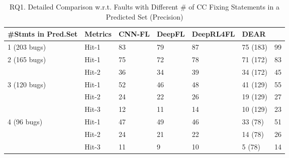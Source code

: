 


\begin{table}[t]
	\caption{RQ1. Detailed Comparison w.r.t. Faults with Different \# of CC Fixing Statements in a Predicted Set (Precision)}
\vspace{-10pt}
        \tabcolsep 2pt
	{\footnotesize
		\begin{center}
			\renewcommand{\arraystretch}{1}
			\begin{tabular}{p{1.3cm}<{\centering}|p{0.8cm}<{\centering}|p{1cm}<{\centering}|p{0.8cm}<{\centering}|p{1.3cm}<{\centering}|p{1cm}<{\centering}|p{1.3cm}<{\centering}}
				\hline
				\#Stmts in Pred.Set & Metrics & CNN-FL & DeepFL & DeepRL4FL & DEAR & \tool \\
				\hline
				\multirow{1}{*}{1 (203 bugs)}   & Hit-1  & 83 & 79 & 87 & 75 (183)& 99 \\
				\hline
				\multirow{2}{*}{2 (165 bugs)}  & Hit-1   & 75 & 72 & 78 & 71 (172) & 83 \\
				& Hit-2       						& 36 & 34 & 39 & 34 (172) & 45 \\
				\hline
				\multirow{3}{*}{3 (120 bugs)}  & Hit-1    & 52 & 46 & 48 & 41 (129) & 55 \\
				& Hit-2         					& 24 & 22 & 26 & 19 (129) & 27\\
				& Hit-3         				  	& 12 &11 & 14 & 10 (129) & 23 \\
				\hline
				\multirow{4}{*}{4 (96 bugs)}  & Hit-1    & 47 & 49 & 46 & 33 (78) & 51 \\
				& Hit-2        				    	 &24 & 21 & 22 & 14 (78) & 26 \\
				& Hit-3       					    & 11 & 9 & 10 & 5 (78) & 14 \\

\end{tabular}
\end{center}}
\end{table}
